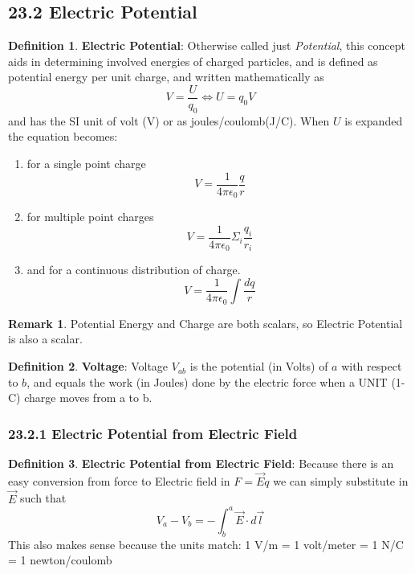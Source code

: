 \documentclass[12pt]{amsart}
\theoremstyle{definition}
\newtheorem{definition}{Definition} %
\newtheorem*{remark}{Remark}        %
\numberwithin{equation}{theorem}    %
\begin{document}
\subsection*{23.2 Electric Potential}

\begin{definition}
    \textbf{Electric Potential}:
    Otherwise called just \textit{Potential}, this concept aids in determining
    involved energies of charged particles, and is defined as potential energy 
    per unit charge, and written mathematically as 
    $$ V = \frac{U}{q_0} \Leftrightarrow U = q_0V$$
    and has the SI unit of volt (V) or as joules/coulomb(J/C). When $U$ is expanded
    the equation becomes:
    \begin{enumerate}
        \item for a single point charge $$V = \frac{1}{4\pi\epsilon_0}\frac{q}{r}$$ 
        \item for multiple point charges $$V = \frac{1}{4\pi\epsilon_0} \Sigma_i \frac{q_i}{r_i}$$ 
        \item and for a continuous distribution of charge. $$V = \frac{1}{4\pi\epsilon_0} \int\frac{dq}{r}$$ 
    \end{enumerate} 
    \begin{remark}
        Potential Energy and Charge are both scalars, so Electric Potential 
        is also a scalar. 
    \end{remark}
\end{definition}



\begin{definition}
    \textbf{Voltage}:
    Voltage $V_{ab}$ is the potential (in Volts) of $a$ with respect to $b$,
    and equals the work (in Joules) done by the electric force when a 
    UNIT (1-C) charge moves from a to b.
\end{definition}


\subsubsection*{23.2.1 Electric Potential from Electric Field}
\begin{definition}
    \textbf{Electric Potential from Electric Field}:
    Because there is an easy conversion from force to Electric field in 
    $F = \vec{E}q$ we can simply substitute in $\vec{E}$ such that 
    $$V_a - V_b = - \int ^a _b \vec{E}\cdot d\vec{l}$$
    This also makes sense because the units match: 1 V/m = 1 volt/meter = 1 N/C = 1 newton/coulomb
\end{definition}
\end{document}
